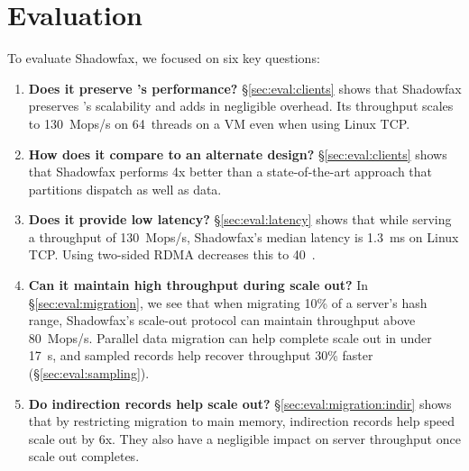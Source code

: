 \section{Evaluation}
\label{sec:eval}

To evaluate Shadowfax, we focused on six key questions:
\begin{enumerate}
\item {\bf Does it preserve \faster{}'s performance?}
  \S\ref{sec:eval:clients} shows that Shadowfax preserves \faster{}'s
  scalability and adds in negligible overhead.
%
  Its throughput scales to 130~Mops/s on 64~threads on a VM even when using
  Linux TCP.

\item {\bf How does it compare to an alternate design?}
  \S\ref{sec:eval:clients} shows that Shadowfax performs 4x better than
  a state-of-the-art approach that partitions dispatch as well as data.

\item {\bf Does it provide low latency?}
  \S\ref{sec:eval:latency} shows that while serving a throughput of 130~Mops/s,
  Shadowfax's median latency is 1.3~ms on Linux TCP.
%
  Using two-sided RDMA decreases this to 40~\us.

\item {\bf Can it maintain high throughput during scale out?}
  In \S\ref{sec:eval:migration}, we see that when migrating 10\% of a server's
  hash range, Shadowfax's scale-out protocol can maintain throughput
  above 80~Mops/s.
%
  Parallel data migration can help complete scale out in under 17~s,
  and sampled records help recover throughput 30\% faster
  (\S\ref{sec:eval:sampling}).

%

\item {\bf Do indirection records help scale out?}
  \S\ref{sec:eval:migration:indir} shows
  that by restricting migration to main memory, indirection records help
  speed scale out by 6x.
%
  They also have a negligible impact on server throughput once scale out
  completes.
%
%


\end{enumerate}
